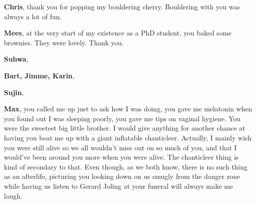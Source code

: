 {\bfseries Chris}, thank you for popping my bouldering cherry. Bouldering with you was always a lot of fun.


{\bfseries Mees}, at the very start of my existence as a PhD student, you baked some brownies. They were lovely. Thank you.

{\bfseries Suhwa},



{\bfseries Bart, Jimme, Karin},

{\bfseries Sujin},

{\bfseries Max}, you called me up just to ask how I was doing, you gave me melatonin when you found out I was sleeping poorly, you gave me tips on vaginal hygiene. You were the sweetest big little brother. I would give anything for another chance at having you beat me up with a giant inflatable chanticleer. Actually, I mainly wish you were still alive so we all wouldn't miss out on so much of you, and that I would've been around you more when you were alive. The chanticleer thing is kind of secondary to that. Even though, as we both know, there is no such thing as an afterlife, picturing you looking down on us smugly from the danger zone while having us listen to Gerard Joling at your funeral will always make me laugh.
